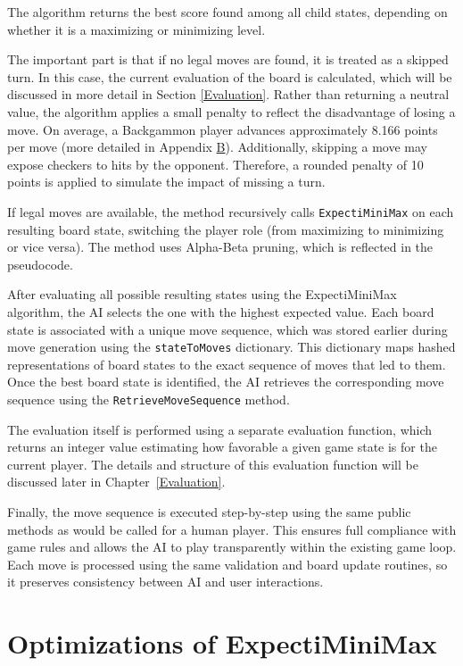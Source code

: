 The algorithm returns the best score found among all child states, depending on whether it is a maximizing or minimizing level.

The important part is that if no legal moves are found, it is treated as a skipped turn. In this case, the current evaluation of the board is calculated, which will be discussed in more detail in Section \ref{Evaluation}. Rather than returning a neutral value, the algorithm applies a small penalty to reflect the disadvantage of losing a move. On average, a Backgammon player advances approximately 8.166 points per move (more detailed in Appendix \hyperref[avg_pips]{B}). Additionally, skipping a move may expose checkers to hits by the opponent. Therefore, a rounded penalty of 10 points is applied to simulate the impact of missing a turn.

If legal moves are available, the method recursively calls \texttt{ExpectiMiniMax} on each resulting board state, switching the player role (from maximizing to minimizing or vice versa). The method uses Alpha-Beta pruning, which is reflected in the pseudocode.

After evaluating all possible resulting states using the ExpectiMiniMax algorithm, the AI selects the one with the highest expected value. Each board state is associated with a unique move sequence, which was stored earlier during move generation using the \texttt{stateToMoves} dictionary. This dictionary maps hashed representations of board states to the exact sequence of moves that led to them. Once the best board state is identified, the AI retrieves the corresponding move sequence using the \texttt{RetrieveMoveSequence} method.

The evaluation itself is performed using a separate evaluation function, which returns an integer value estimating how favorable a given game state is for the current player. The details and structure of this evaluation function will be discussed later in Chapter~\ref{Evaluation}.

Finally, the move sequence is executed step-by-step using the same public methods as would be called for a human player. This ensures full compliance with game rules and allows the AI to play transparently within the existing game loop. Each move is processed using the same validation and board update routines, so it preserves consistency between AI and user interactions.


\chapter{Optimizations of ExpectiMiniMax}\label{Optimizations}


